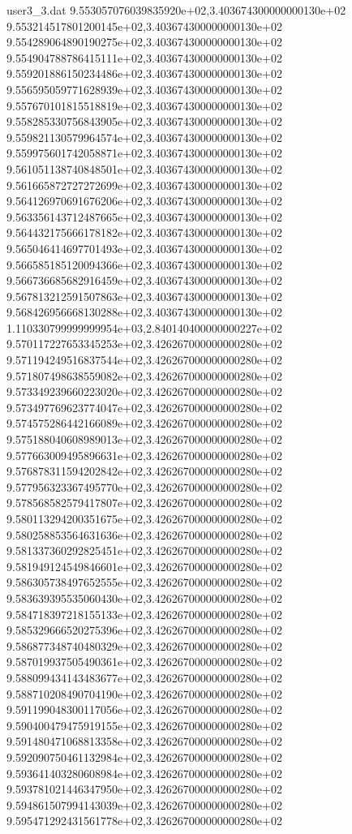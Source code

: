 \begin{filecontents}{user3_3.dat}
9.553057076039835920e+02,3.403674300000000130e+02
9.553214517801200145e+02,3.403674300000000130e+02
9.554289064890190275e+02,3.403674300000000130e+02
9.554904788786415111e+02,3.403674300000000130e+02
9.559201886150234486e+02,3.403674300000000130e+02
9.556595059771628939e+02,3.403674300000000130e+02
9.557670101815518819e+02,3.403674300000000130e+02
9.558285330756843905e+02,3.403674300000000130e+02
9.559821130579964574e+02,3.403674300000000130e+02
9.559975601742058871e+02,3.403674300000000130e+02
9.561051138740848501e+02,3.403674300000000130e+02
9.561665872727272699e+02,3.403674300000000130e+02
9.564126970691676206e+02,3.403674300000000130e+02
9.563356143712487665e+02,3.403674300000000130e+02
9.564432175666178182e+02,3.403674300000000130e+02
9.565046414697701493e+02,3.403674300000000130e+02
9.566585185120094366e+02,3.403674300000000130e+02
9.566736685682916459e+02,3.403674300000000130e+02
9.567813212591507863e+02,3.403674300000000130e+02
9.568426956668130288e+02,3.403674300000000130e+02
1.110330799999999954e+03,2.840140400000000227e+02
9.570117227653345253e+02,3.426267000000000280e+02
9.571194249516837544e+02,3.426267000000000280e+02
9.571807498638559082e+02,3.426267000000000280e+02
9.573349239660223020e+02,3.426267000000000280e+02
9.573497769623774047e+02,3.426267000000000280e+02
9.574575286442166089e+02,3.426267000000000280e+02
9.575188040608989013e+02,3.426267000000000280e+02
9.577663009495896631e+02,3.426267000000000280e+02
9.576878311594202842e+02,3.426267000000000280e+02
9.577956323367495770e+02,3.426267000000000280e+02
9.578568582579417807e+02,3.426267000000000280e+02
9.580113294200351675e+02,3.426267000000000280e+02
9.580258853564631636e+02,3.426267000000000280e+02
9.581337360292825451e+02,3.426267000000000280e+02
9.581949124549846601e+02,3.426267000000000280e+02
9.586305738497652555e+02,3.426267000000000280e+02
9.583639395535060430e+02,3.426267000000000280e+02
9.584718397218155133e+02,3.426267000000000280e+02
9.585329666520275396e+02,3.426267000000000280e+02
9.586877348740480329e+02,3.426267000000000280e+02
9.587019937505490361e+02,3.426267000000000280e+02
9.588099434143483677e+02,3.426267000000000280e+02
9.588710208490704190e+02,3.426267000000000280e+02
9.591199048300117056e+02,3.426267000000000280e+02
9.590400479475919155e+02,3.426267000000000280e+02
9.591480471068813358e+02,3.426267000000000280e+02
9.592090750461132984e+02,3.426267000000000280e+02
9.593641403280608984e+02,3.426267000000000280e+02
9.593781021446347950e+02,3.426267000000000280e+02
9.594861507994143039e+02,3.426267000000000280e+02
9.595471292431561778e+02,3.426267000000000280e+02

\end{filecontents}
